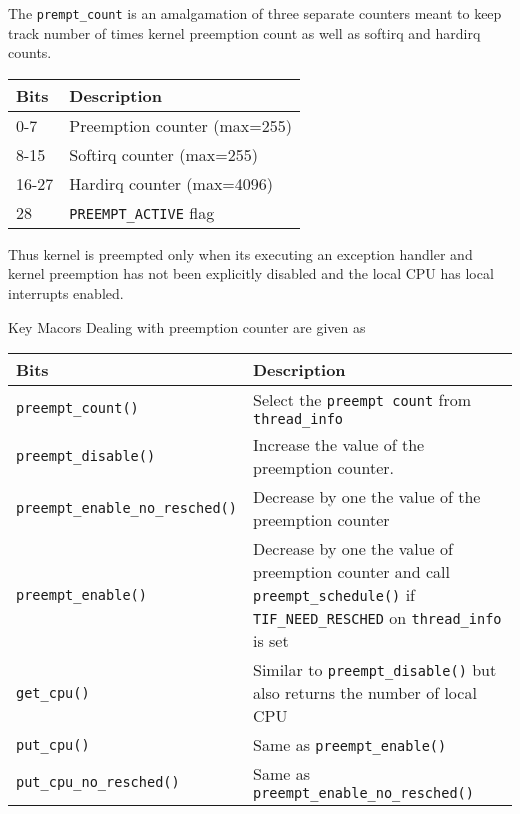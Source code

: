 \documentclass{article}
\begin{document}
The \lstinline{prempt_count} is an amalgamation of three separate
counters meant to keep track number of times kernel preemption count
as well as softirq and hardirq counts.

\begin{center}
  \begin{tabular}{ l | l }    
    \hline
    Bits & Description                    \\ \hline
    0-7 & Preemption counter (max=255)    \\ 
    8-15 & Softirq counter (max=255)      \\ 
    16-27 &  Hardirq counter (max=4096)   \\ 
    28 & \lstinline{PREEMPT_ACTIVE} flag  \\ \hline
  \end{tabular}
\end{center}

Thus kernel is preempted only when its executing an exception handler
and kernel preemption has not been explicitly disabled and the local
CPU has local interrupts enabled.

Key Macors Dealing with preemption counter are given as 

\begin{center}
  \begin{tabular}{ l | p{9 cm} }    
    \hline
    Bits & Description                    \\ \hline
    \lstinline{preempt_count()} & Select the \lstinline{preempt count} from \lstinline{thread_info}    \\ 
    \lstinline{preempt_disable()} & Increase the value of the preemption counter.     \\ 
    \lstinline{preempt_enable_no_resched()} &  Decrease by one the value of the preemption counter  \\
    \lstinline{preempt_enable()} & Decrease by one the value of preemption counter and call \lstinline{preempt_schedule()} if \lstinline{TIF_NEED_RESCHED} on \lstinline{thread_info} is set \\
    \lstinline{get_cpu()} & Similar to \lstinline{preempt_disable()} but also returns the number of local CPU \\
    \lstinline{put_cpu()} & Same as  \lstinline{preempt_enable()} \\
    \lstinline{put_cpu_no_resched()} & Same as \lstinline{preempt_enable_no_resched()}    \\
    \hline
  \end{tabular}
\end{center}
\end{document}

